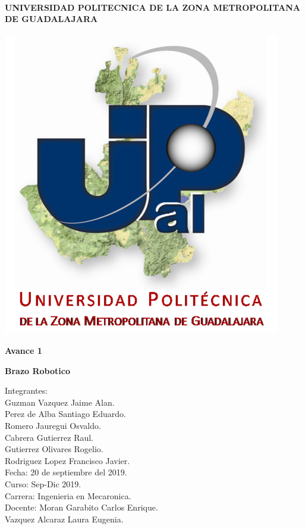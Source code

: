 \documentclass[14pt,a4paper]{article}
\author{Rodriguez Lopez Francisco Javier}
\begin{document}
\begin{center}
\paragraph{\large UNIVERSIDAD POLITECNICA DE LA ZONA METROPOLITANA DE GUADALAJARA}

\includegraphics[scale=1]{Upzmg.png} 
\end{center}
\begin{center}
\textbf{\LARGE Avance 1}\\
\end{center}
\begin{center}
\textbf{\LARGE Brazo Robotico}
\end{center}


\large{Integrantes:}\\
\large{Guzman Vazquez Jaime Alan.\\
Perez de Alba Santiago Eduardo.\\
Romero Jauregui Osvaldo.\\
Cabrera Gutierrez Raul.\\
Gutierrez Olivares Rogelio.\\
Rodriguez Lopez Francisco Javier.\\

Fecha: 20 de septiembre del 2019.\\

Curso: Sep-Dic 2019.\\

Carrera: Ingenieria en Mecaronica.\\

Docente: Moran Garabito Carlos Enrique.\\
Vazquez Alcaraz Laura Eugenia.}
\end{document}
